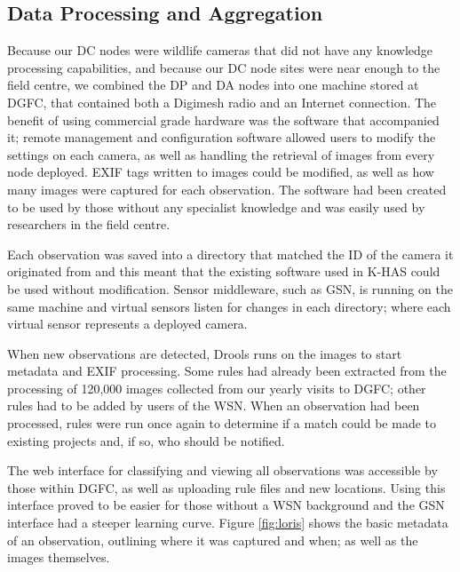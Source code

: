 		\subsection{Data Processing and Aggregation}
				Because our DC nodes were wildlife cameras that did not have any knowledge processing capabilities, and because our DC node sites were near enough to the field centre, we combined the DP and DA nodes into one machine stored at DGFC, that contained both a Digimesh radio and an Internet connection. The benefit of using commercial grade hardware was the software that accompanied it; remote management and configuration software allowed users to modify the settings on each camera, as well as handling the retrieval of images from every node deployed. EXIF tags written to images could be modified, as well as how many images were captured for each observation. The software had been created to be used by those without any specialist knowledge and was easily used by researchers in the field centre.
				
				Each observation was saved into a directory that matched the ID of the camera it originated from and this meant that the existing software used in K-HAS could be used without modification. Sensor middleware, such as GSN, is running on the same machine and virtual sensors listen for changes in each directory; where each virtual sensor represents a deployed camera.
				
				When new observations are detected, Drools runs on the images to start metadata and EXIF processing. Some rules had already been extracted from the processing of 120,000 images collected from our yearly visits to DGFC; other rules had to be added by users of the WSN. When an observation had been processed, rules were run once again to determine if a match could be made to existing projects and, if so, who should be notified.
				
				The web interface for classifying and viewing all observations was accessible by those within DGFC, as well as uploading rule files and new locations. Using this interface proved to be easier for those without a WSN background and the GSN interface had a steeper learning curve.	Figure \ref{fig:loris} shows the basic metadata of an observation, outlining where it was captured and when; as well as the images themselves.
				
